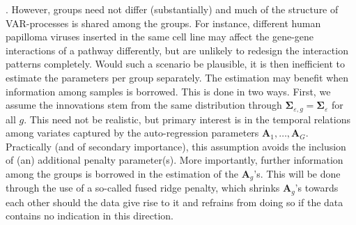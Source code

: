 \cite{Miok2017}. However, groups need not differ (substantially) and much of the structure of VAR-processes is shared among the groups. For instance, different human papilloma viruses inserted in the same cell line may affect the gene-gene interactions of a pathway differently, but are unlikely to redesign the interaction patterns completely. Would such a scenario be plausible, it is then inefficient to estimate the parameters per group separately. The estimation may benefit when information among samples is borrowed. This is done in two ways. First, we assume the innovations stem from the same distribution through $\mathbf{\Sigma}_{\varepsilon, g} = \mathbf{\Sigma}_{\varepsilon}$ for all $g$.  This need not be realistic, but primary interest is in the temporal relations among variates captured by the auto-regression parameters $\mathbf{A}_1, \ldots, \mathbf{A}_G$. Practically (and of secondary importance), this assumption avoids the inclusion of (an) additional penalty parameter(s). More importantly, further information among the groups is borrowed in the estimation of the  $\mathbf{A}_g$'s. This will be done through the use of a so-called fused ridge penalty, which shrinks $\mathbf{A}_g$'s towards each other should the data give rise to it and refrains from doing so if the data contains no indication in this direction.


